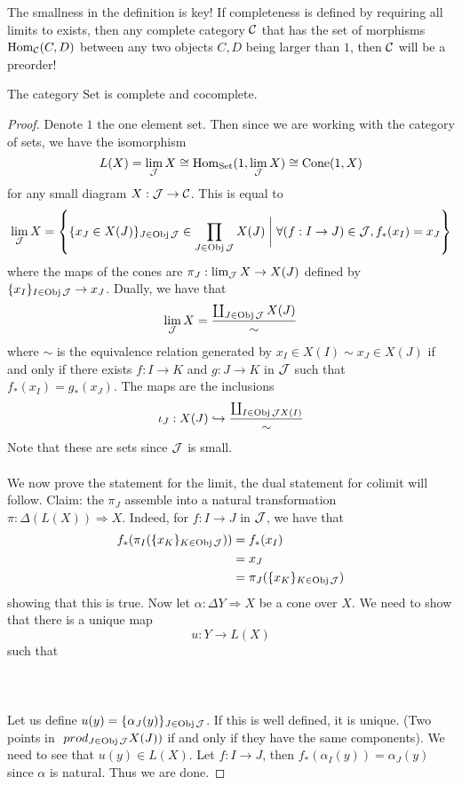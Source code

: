 \documentclass[a4paper]{article}
\begin{document}
The smallness in the definition is key! If completeness is defined by requiring all limits to exists, then any complete category $\mathcal{C}$ that has the set of morphisms $\operatorname{Hom}_{\mathcal{C}}(C,D)$ between any two objects $C,D$ being larger than $1$, then $\mathcal{C}$
will be a preorder!

\begin{thm}{}{} The category $\text{Set}$ is complete and cocomplete. \tcbline
\begin{proof}
Denote $1$ the one element set. Then since we are working with the category of sets, we have the isomorphism $$L(X)=\lim_{\mathcal{J}} X\cong\operatorname{Hom}_\text{Set}(1,\lim_{\mathcal{J}} X)\cong\text{Cone}(1,X)$$ for any small diagram $X:\mathcal{J}\to\mathcal{C}$. This is equal to $$\lim_{\mathcal{J}} X=\left\{\{x_J\in X(J)\}_{J\in\operatorname{Obj}\mathcal{J}}\in\prod_{J\in\operatorname{Obj}\mathcal{J}}X(J)\;\bigg{|}\;\forall (f:I\to J)\in\mathcal{J}, f_\ast(x_I)=x_J\right\}$$ where the maps of the cones are $\pi_J:\lim_{\mathcal{J}} X\to X(J)$ defined by $\{x_I\}_{I\in\operatorname{Obj}\mathcal{J}}\to x_J$. Dually, we have that $$\lim_{\mathcal{J}} X=\frac{\coprod_{J\in\operatorname{Obj}\mathcal{J}}X(J)}{\sim}$$ where $\sim$ is the equivalence relation generated by $x_I\in X(I)\sim x_J\in X(J)$ if and only if there exists $f:I\to K$ and $g:J\to K$ in $\mathcal{J}$ such that $f_\ast(x_I)=g_\ast(x_J)$. The maps are the inclusions $$\iota_J:X(J)\hookrightarrow\frac{\coprod_{I\in\operatorname{Obj}\mathcal{J} X(I)}}{\sim}$$ Note that these are sets since $\mathcal{J}$ is small. \\~\\

We now prove the statement for the limit, the dual statement for colimit will follow. Claim: the $\pi_J$ assemble into a natural transformation $\pi:\Delta(L(X))\Rightarrow X$. Indeed, for $f:I\to J$ in $\mathcal{J}$, we have that 
\begin{align*}
f_\ast(\pi_I(\{x_K\}_{K\in\operatorname{Obj}\mathcal{J}}))&=f_\ast(x_I)\\
&=x_J\\
&=\pi_J(\{x_K\}_{K\in\operatorname{Obj}\mathcal{J}})
\end{align*}
showing that this is true. Now let $\alpha:\Delta Y\Rightarrow X$ be a cone over $X$. We need to show that there is a unique map $$u:Y\to L(X)$$ such that \\~\\
\\~\\
Let us define $u(y)=\{\alpha_J(y)\}_{J\in\operatorname{Obj}\mathcal{J}}$. If this is well defined, it is unique. (Two points in $\ prod_{J\in\operatorname{Obj}\mathcal{J}}X(J))$ if and only if they have the same components). We need to see that $u(y)\in L(X)$. Let $f:I\to J$, then $f_\ast(\alpha_I(y))=\alpha_J(y)$ since $\alpha$ is natural. Thus we are done. 
\end{proof}
\end{thm}
\end{document}
